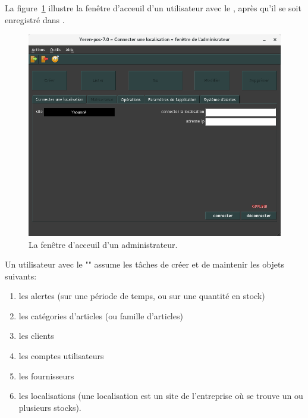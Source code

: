 \label{sec:utilisateurs-ladministrateur}

La figure~\ref{fig:fenetre-principale-admin} illustre la
fen\^etre d'acceuil d'un utilisateur avec le \role \admin,
apr\`es qu'il se soit enregistr\'e dans \yeren.\\

\begin{figure}[!htbp]
\centering
\includegraphics[scale=0.63]{images/yeren-fenetre-administrateur.png}
\caption{La fen\^etre d'acceuil d'un administrateur.}
\label{fig:fenetre-principale-admin}
\end{figure}

Un utilisateur avec le \role "\admin" assume les
t\^aches de cr\'eer et de maintenir les objets suivants:
\begin{enumerate}[1)]
	\item les alertes (sur une p\'eriode de temps, ou sur une quantit\'e en stock)
	\item les cat\'egories d'articles (ou famille d'articles)
	\item les clients
	\item les comptes utilisateurs
	\item les fournisseurs				
	\item les localisations (une localisation est un site de
	      l'entreprise o\`u se trouve un ou plusieurs stocks).\\   
\end{enumerate}